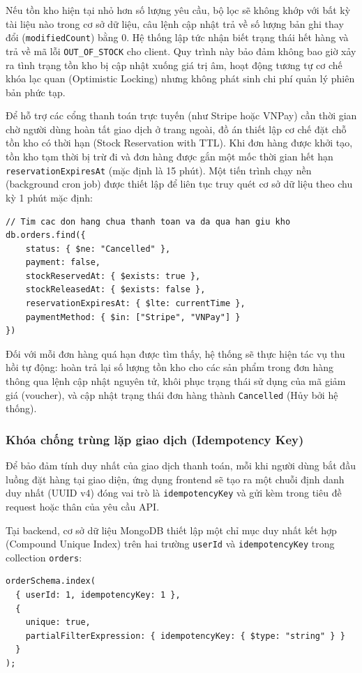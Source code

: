 \documentclass[../DoAn.tex]{subfiles}
\begin{document}
Nếu tồn kho hiện tại nhỏ hơn số lượng yêu cầu, bộ lọc sẽ không khớp với bất kỳ tài liệu nào trong cơ sở dữ liệu, câu lệnh cập nhật trả về số lượng bản ghi thay đổi (\texttt{modifiedCount}) bằng $0$. Hệ thống lập tức nhận biết trạng thái hết hàng và trả về mã lỗi \texttt{OUT\_OF\allowbreak\_STOCK} cho client. Quy trình này bảo đảm không bao giờ xảy ra tình trạng tồn kho bị cập nhật xuống giá trị âm, hoạt động tương tự cơ chế khóa lạc quan (Optimistic Locking) nhưng không phát sinh chi phí quản lý phiên bản phức tạp.

Để hỗ trợ các cổng thanh toán trực tuyến (như Stripe hoặc VNPay) cần thời gian chờ người dùng hoàn tất giao dịch ở trang ngoài, đồ án thiết lập cơ chế đặt chỗ tồn kho có thời hạn (Stock Reservation with TTL). Khi đơn hàng được khởi tạo, tồn kho tạm thời bị trừ đi và đơn hàng được gắn một mốc thời gian hết hạn \texttt{reservationExpiresAt} (mặc định là 15 phút). Một tiến trình chạy nền (background cron job) được thiết lập để liên tục truy quét cơ sở dữ liệu theo chu kỳ 1 phút mặc định:
\begin{lstlisting}[breaklines=true,basicstyle=\ttfamily\small,columns=fullflexible]
// Tim cac don hang chua thanh toan va da qua han giu kho
db.orders.find({
    status: { $ne: "Cancelled" },
    payment: false,
    stockReservedAt: { $exists: true },
    stockReleasedAt: { $exists: false },
    reservationExpiresAt: { $lte: currentTime },
    paymentMethod: { $in: ["Stripe", "VNPay"] }
})
\end{lstlisting}

Đối với mỗi đơn hàng quá hạn được tìm thấy, hệ thống sẽ thực hiện tác vụ thu hồi tự động: hoàn trả lại số lượng tồn kho cho các sản phẩm trong đơn hàng thông qua lệnh cập nhật nguyên tử, khôi phục trạng thái sử dụng của mã giảm giá (voucher), và cập nhật trạng thái đơn hàng thành \texttt{Cancelled} (Hủy bởi hệ thống).

\subsubsection{Khóa chống trùng lặp giao dịch (Idempotency Key)}
Để bảo đảm tính duy nhất của giao dịch thanh toán, mỗi khi người dùng bắt đầu luồng đặt hàng tại giao diện, ứng dụng frontend sẽ tạo ra một chuỗi định danh duy nhất (UUID v4) đóng vai trò là \texttt{idempotencyKey} và gửi kèm trong tiêu đề request hoặc thân của yêu cầu API. 

Tại backend, cơ sở dữ liệu MongoDB thiết lập một chỉ mục duy nhất kết hợp (Compound Unique Index) trên hai trường \texttt{userId} và \texttt{idempotencyKey} trong collection \texttt{orders}:
\begin{lstlisting}[breaklines=true,basicstyle=\ttfamily\small,columns=fullflexible]
orderSchema.index(
  { userId: 1, idempotencyKey: 1 },
  {
    unique: true,
    partialFilterExpression: { idempotencyKey: { $type: "string" } }
  }
);
\end{lstlisting}
\end{document}
